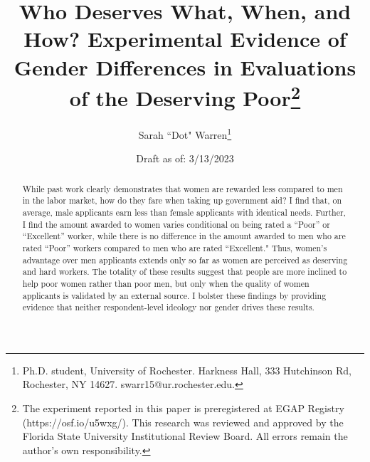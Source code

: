 \documentclass[12pt]{article}%
\author{Sarah ``Dot" Warren\thanks{Ph.D. student, University of Rochester. Harkness Hall, 333 Hutchinson Rd, Rochester, NY 14627. swarr15@ur.rochester.edu.}}
\title{Who Deserves What, When, and How? Experimental Evidence of Gender Differences in Evaluations of the Deserving Poor\thanks{The experiment reported in this paper is preregistered at EGAP Registry (https://osf.io/u5wxg/). This research was reviewed and approved by the Florida State University Institutional Review Board. All errors remain the author's own responsibility.}}
\date{Draft as of: 3/13/2023}
\begin{document}
\maketitle
\thispagestyle{empty}


\begin{abstract}
While past work clearly demonstrates that women are rewarded less compared to men in the labor market, how do they fare when taking up government aid? I find that, on average, male applicants earn less than female applicants with identical needs. Further, I find the amount awarded to women varies conditional on being rated a ``Poor” or ``Excellent” worker, while there is no difference in the amount awarded to men who are rated ``Poor” workers compared to men who are rated ``Excellent." Thus, women’s advantage over men applicants extends only so far as women are perceived as deserving and hard workers. The totality of these results suggest that people are more inclined to help poor women rather than poor men, but only when the quality of women applicants is validated by an external source. I bolster these findings by providing evidence that neither respondent-level ideology nor gender drives these results.


\end{abstract}


\newpage
\end{document}
